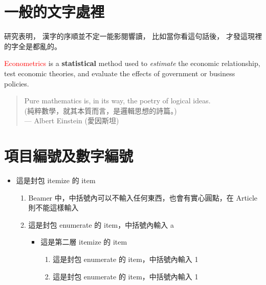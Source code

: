 \documentclass[utf8,12pt]{article} %
\begin{document}
\section{一般的文字處裡}
\begin{spacing}{1.5}
%
研究表明，
漢字的序順並不定一能影閱響讀，
比如當你看這句話後，
才發這現裡的字全是都亂的。

\textcolor{red}{Econometrics} is a \textbf{statistical} method used to \textit{estimate} the economic relationship,
test economic theories, and evaluate the effects of government or business policies.

\begin{quote}
	Pure mathematics is, in its way, the poetry of logical ideas.\\
	(純粹數學，就其本質而言，是邏輯思想的詩篇。)\\
	--- Albert Einstein (愛因斯坦)
\end{quote}
%
\end{spacing}
%
%
\newpage
\section{項目編號及數字編號}
\begin{spacing}{1.5}
%
\begin{itemize} %
\item 這是封包 itemize 的 item
		\begin{enumerate}[a] %
			\item Beamer 中，中括號內可以不輸入任何東西，也會有實心圓點，在 Article 則不能這樣輸入
			\item 這是封包 enumerate 的 item，中括號內輸入 a
			\begin{itemize} %
				\item 這是第二層 itemize 的 item
				\begin{enumerate}[1] %
					\item 這是封包 enumerate 的 item，中括號內輸入 1
					\item 這是封包 enumerate 的 item，中括號內輸入 1
				\end{enumerate}
			\end{itemize}
		\end{enumerate}
\end{itemize}
\end{spacing}
%
%
\end{document}
